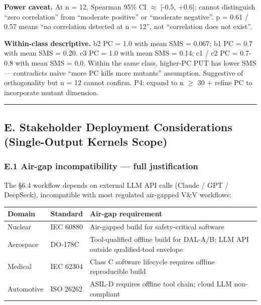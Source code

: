 \documentclass[review,12pt,authoryear]{elsarticle}
\newcounter{none}                   %
\begin{document}
\textbf{Power caveat.} At n = 12, Spearman 95\% CI $\approx$ {[}-0.5, +0.6{]};
cannot distinguish ``zero correlation'' from ``moderate positive'' or
``moderate negative''. p = 0.61 / 0.57 means ``no correlation detected
at n = 12'', not ``correlation does not exist''.

\textbf{Within-class descriptive.} b2 PC = 1.0 with mean SMS = 0.067; b1
PC = 0.7 with mean SMS = 0.20. c3 PC = 1.0 with mean SMS = 0.14; c1 / c2
PC = 0.7-0.8 with mean SMS = 0.0. Within the same class, higher-PC PUT
has lower SMS --- contradicts naive ``more PC kills more mutants''
assumption. Suggestive of orthogonality but n = 12 cannot confirm. P4:
expand to n $\geq$ 30 + refine PC to incorporate mutant dimension.

\begin{center}\rule{0.5\linewidth}{0.5pt}\end{center}

\subsection{E. Stakeholder Deployment Considerations (Single-Output
Kernels
Scope)}\label{e.-stakeholder-deployment-considerations-single-output-kernels-scope}

\subsubsection{E.1 Air-gap incompatibility --- full
justification}\label{e.1-air-gap-incompatibility-full-justification}

The §6.4 workflow depends on external LLM API calls (Claude / GPT /
DeepSeek), incompatible with most regulated air-gapped V\&V workflows:

{\def\LTcaptype{none} %
\begin{longtable}[]{@{}
  >{\raggedright\arraybackslash}p{}
  >{\raggedright\arraybackslash}p{}
  >{\raggedright\arraybackslash}p{}@{}}
\toprule\noalign{}
\begin{minipage}[b]{\linewidth}\raggedright
Domain
\end{minipage} & \begin{minipage}[b]{\linewidth}\raggedright
Standard
\end{minipage} & \begin{minipage}[b]{\linewidth}\raggedright
Air-gap requirement
\end{minipage} \\
\midrule\noalign{}
\endhead
\bottomrule\noalign{}
\endlastfoot
Nuclear & IEC 60880 & Air-gapped build for safety-critical software \\
Aerospace & DO-178C & Tool-qualified offline build for DAL-A/B; LLM API
outside qualified-tool envelope \\
Medical & IEC 62304 & Class C software lifecycle requires offline
reproducible build \\
Automotive & ISO 26262 & ASIL-D requires offline tool chain; cloud LLM
non-compliant \\
\end{longtable}
}
\end{document}
